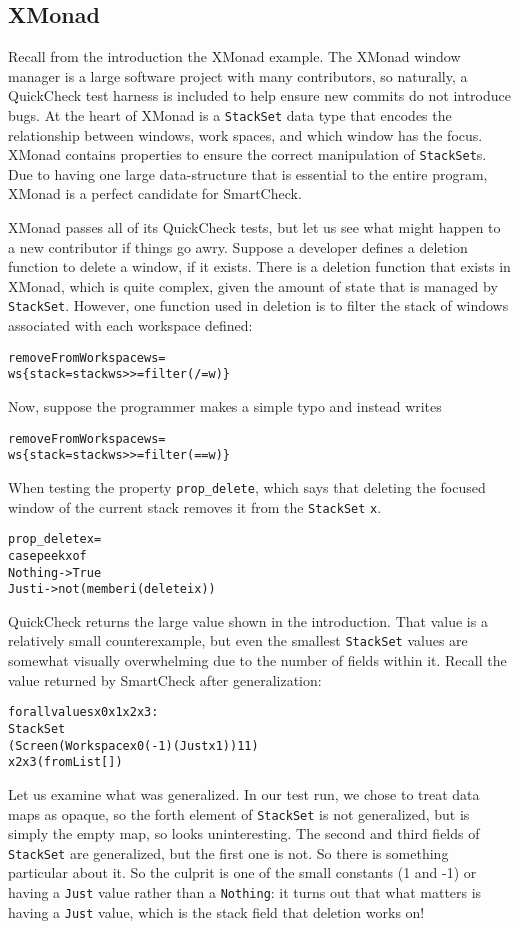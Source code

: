 \documentclass{sigplanconf}
\newenvironment{code}{\begin{alltt}\footnotesize}{\end{alltt}}
\newcommand{\ttp}[1]{\texttt{#1}}
\begin{document}
\subsection{XMonad}
Recall from the introduction the XMonad example.  The XMonad window manager is a
large software project with many contributors, so naturally, a QuickCheck
test harness is included to help ensure new commits do not introduce bugs.  At
the heart of XMonad is a \ttp{StackSet} data type that encodes the relationship
between windows, work spaces, and which window has the focus.  XMonad contains
properties to ensure the correct manipulation of \ttp{StackSet}s.  Due to having
one large data-structure that is essential to the entire program, XMonad is a
perfect candidate for SmartCheck.

XMonad passes all of its QuickCheck tests, but let us see what might happen to a
new contributor if things go awry.  Suppose a developer defines a deletion
function to delete a window, if it exists.  There is a deletion function that
exists in XMonad, which is quite complex, given the amount of state that is managed
by \ttp{StackSet}.  However, one function used in deletion is to filter the
stack of windows associated with each workspace defined:
%
\begin{code}
removeFromWorkspace ws =
  ws \{ stack = stack ws >>= filter (/= w) \}
\end{code}
%
\noindent
Now, suppose the programmer makes a simple typo and instead writes
%
\begin{code}
removeFromWorkspace ws =
  ws \{ stack = stack ws >>= filter (== w) \}
\end{code}
%
\noindent
When testing the property \ttp{prop\_delete}, which says that deleting the
focused window of the current stack removes it from the \ttp{StackSet} \ttp{x}.
%
\begin{code}
prop_delete x =
    case peek x of
        Nothing -> True
        Just i  -> not (member i (delete i x))
\end{code}
%
\noindent
QuickCheck returns the large value shown in the introduction.  That value is a
relatively small counterexample, but even the smallest \ttp{StackSet} values are
somewhat visually overwhelming due to the number of fields within it.  Recall
the value returned by SmartCheck after generalization:
%
\begin{code}
forall values x0 x1 x2 x3:
  StackSet
    (Screen (Workspace x0 (-1) (Just x1)) 1 1)
    x2 x3 (fromList [])
\end{code}
%
\noindent
Let us examine what was generalized.  In our test run, we chose to treat data
maps as opaque, so the forth element of \ttp{StackSet} is not generalized, but
is simply the empty map, so looks uninteresting.  The second and third fields of
\ttp{StackSet} are generalized, but the first one is not.  So there is something
particular about it.  So the culprit is one of the small constants (1 and -1) or
having a \ttp{Just} value rather than a \ttp{Nothing}: it turns out that what
matters is having a \ttp{Just} value, which is the stack field that deletion
works on!
\end{document}
